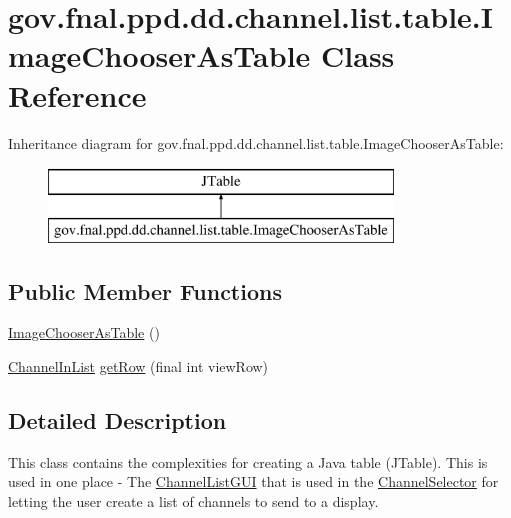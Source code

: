 \hypertarget{classgov_1_1fnal_1_1ppd_1_1dd_1_1channel_1_1list_1_1table_1_1ImageChooserAsTable}{\section{gov.\-fnal.\-ppd.\-dd.\-channel.\-list.\-table.\-Image\-Chooser\-As\-Table Class Reference}
\label{classgov_1_1fnal_1_1ppd_1_1dd_1_1channel_1_1list_1_1table_1_1ImageChooserAsTable}
}
Inheritance diagram for gov.\-fnal.\-ppd.\-dd.\-channel.\-list.\-table.\-Image\-Chooser\-As\-Table\-:\begin{figure}[H]
\begin{center}
\leavevmode
\includegraphics[height=2.000000cm]{classgov_1_1fnal_1_1ppd_1_1dd_1_1channel_1_1list_1_1table_1_1ImageChooserAsTable}
\end{center}
\end{figure}
\subsection*{Public Member Functions}
\begin{DoxyCompactItemize}
\item 
\hyperlink{classgov_1_1fnal_1_1ppd_1_1dd_1_1channel_1_1list_1_1table_1_1ImageChooserAsTable_a858581e0d46336c42a0134a9e7c0c254}{Image\-Chooser\-As\-Table} ()
\item 
\hyperlink{interfacegov_1_1fnal_1_1ppd_1_1dd_1_1channel_1_1ChannelInList}{Channel\-In\-List} \hyperlink{classgov_1_1fnal_1_1ppd_1_1dd_1_1channel_1_1list_1_1table_1_1ImageChooserAsTable_a9f26ba4f35ca09da14792b4b8b05c94e}{get\-Row} (final int view\-Row)
\end{DoxyCompactItemize}


\subsection{Detailed Description}
This class contains the complexities for creating a Java table (J\-Table). This is used in one place -\/ The \hyperlink{classgov_1_1fnal_1_1ppd_1_1dd_1_1channel_1_1list_1_1ChannelListGUI}{Channel\-List\-G\-U\-I} that is used in the \hyperlink{classgov_1_1fnal_1_1ppd_1_1dd_1_1ChannelSelector}{Channel\-Selector} for letting the user create a list of channels to send to a display.

